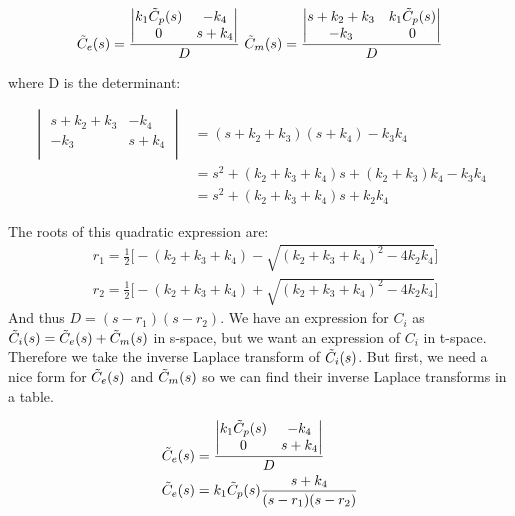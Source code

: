 \documentclass[12pt,twoside]{article}
\begin{document}
\begin{align*}
  \tilde{ C }_e(s) &= \frac { \begin{vmatrix}
        k_1  \tilde{ C }_p(s) & - k_4  \\
        0 & s + k_4  \\
      \end{vmatrix} } {D} ~
  \tilde{ C }_m(s) = \frac { \begin{vmatrix}
        s + k_2 + k_3  & k_1 \tilde{ C }_p(s)\\
        -k_3 & 0  \\
      \end{vmatrix} } {D} \\
\end{align*}

where D is the determinant:

\begin{align*}
\begin{vmatrix}
        s + k_2 + k_3  & - k_4  \\
        - k_3 & s + k_4  \\
      \end{vmatrix} &= (s + k_2 + k_3) (s+ k_4) - k_3 k_4 \\
      &= s^2 + (k_2 + k_3 + k_4 ) s + (k_2 + k_3) k_4 - k_3 k_4 \\
      &= s^2 + (k_2 + k_3 + k_4) s + k_2 k_4
\end{align*}

The roots of this quadratic expression are:
\begin{align*}
& r_1 = \frac{1}{2} \bigg [ - (k_2 + k_3 + k_4) - \sqrt{ (k_2 + k_3 + k_4)^2 - 4 k_2 k_4} \bigg] \\
& r_2 = \frac{1}{2} \bigg [ - (k_2 + k_3 + k_4) + \sqrt{ (k_2 + k_3 + k_4)^2 - 4 k_2 k_4} \bigg]
\end{align*}
And thus $D = (s - r_1) (s - r_2)$. We have an expression for $C_i$ as $\tilde{ C }_i(s)= \tilde{ C }_e(s) + \tilde{ C }_m(s)$ in s-space, but we want an expression of $C_i$ in t-space.
Therefore we take the inverse Laplace transform of $\tilde{ C }_i(s)$. But first, we need a nice form for $\tilde{ C }_e(s)$ and $\tilde{ C }_m(s)$ so we can
find their inverse Laplace transforms in a table.

\begin{align*}
  \tilde{ C }_e(s) &= \frac { \begin{vmatrix}
        k_1  \tilde{ C }_p(s) & - k_4  \\
        0 & s + k_4  \\
      \end{vmatrix} } {D} \\ 
  \tilde{ C }_e(s) &= k_1  \tilde{ C }_p(s) \frac { s + k_4 }  { (s-r_1) (s-r_2)} \\ 
\end{align*}
\end{document}
